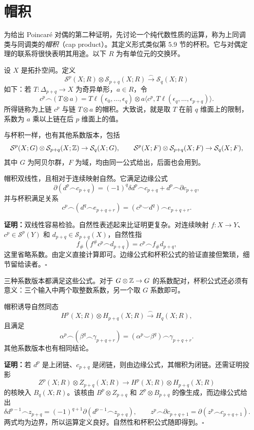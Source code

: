 \section{帽积}
为给出 Poincaré 对偶的第二种证明，先讨论一个纯代数性质的运算，称为上同调类与同调类的\emph{帽积}（cap product）。其定义形式类似第 5.9 节的杯积。它与对偶定理的联系将很快表明其用途。以下 $R$ 为有单位元的交换环。

设 $X$ 是拓扑空间。定义
\[\mathcal S^p(X;R)\otimes\mathcal S_{p+q}(X;R)\xrightarrow{\frown}\mathcal S_q(X;R)\]
如下：若 $T:\Delta_{p+q}\to X$ 为奇异单形，$a\in R$，令
\[
c^p\frown(T\otimes a)=T\ell(\epsilon_0,\ldots,\epsilon_q)
\otimes a\langle c^p,T\ell(\epsilon_q,\ldots,\epsilon_{p+q})\rangle.
\]
所得链称为上链 $c^p$ 与链 $T\otimes a$ 的帽积。大致说，就是取 $T$ 在前 $q$ 维面上的限制，系数为 $a$ 乘以上链在后 $p$ 维面上的值。

与杯积一样，也有其他系数版本，包括
\[
\mathcal S^p(X;G)\otimes\mathcal S_{p+q}(X;\mathbb{Z})\to\mathcal S_q(X;G),\qquad
\mathcal S^p(X;F)\otimes\mathcal S_{p+q}(X;F)\to\mathcal S_q(X;F),
\]
其中 $G$ 为阿贝尔群，$F$ 为域，均由同一公式给出，后面也会用到。

帽积双线性，且相对于连续映射自然。它满足边缘公式
\[\partial(d^p\frown c_{p+q})=(-1)^q\delta d^p\frown c_{p+q}+d^p\frown\partial c_{p+q},\]
并与杯积满足关系
\[c^p\frown(d^q\frown e_{p+q+r})=(c^p\smile d^q)\frown e_{p+q+r}.\]

\textbf{证明：}双线性容易检验。自然性表述起来比证明更复杂。对连续映射 $f:X\to Y$、$c^p\in\mathcal S^p(Y)$ 和 $d_{p+q}\in\mathcal S_{p+q}(X)$，自然性指
\[f_\#(f^\#c^p\frown d_{p+q})=c^p\frown f_\#d_{p+q},\]
这里省略系数。由定义直接计算即可。边缘公式和杯积公式的验证直接但繁琐，细节留给读者。\hfill$\square$

三种系数版本都满足这些公式。对于 $G\otimes\mathbb{Z}\to G$ 的系数配对，杯积公式还必须有意义：三个输入中两个取整数系数，另一个取 $G$ 系数即可。

帽积诱导自然同态
\[H^p(X;R)\otimes H_{p+q}(X;R)\xrightarrow{\frown}H_q(X;R),\]
且满足
\[\alpha^p\frown(\beta^q\frown\gamma_{p+q+r})=(\alpha^p\smile\beta^q)\frown\gamma_{p+q+r}.\]
其他系数版本也有相同结论。

\textbf{证明：}若 $d^p$ 是上闭链、$c_{p+q}$ 是闭链，则由边缘公式，其帽积为闭链。还需证明投影
\[Z^p(X;R)\otimes Z_{p+q}(X;R)\to H^p(X;R)\otimes H_{p+q}(X;R)\]
的核映入 $B_q(X;R)$。该核由 $B^p\otimes Z_{p+q}$ 和 $Z^p\otimes B_{p+q}$ 的像生成，而边缘公式给出
\[
\delta d^{p-1}\frown z_{p+q}=(-1)^{q+1}\partial(d^{p-1}\frown z_{p+q}),\qquad
z^p\frown\partial c_{p+q+1}=\partial(z^p\frown c_{p+q+1}).
\]
两式均为边界，所以运算定义良好。自然性和杯积公式随即得到。\hfill$\square$

